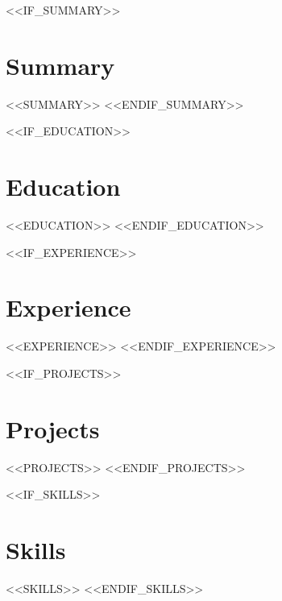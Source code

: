 \documentclass{article}
\begin{document}
\begin{center}
{\sffamily\LARGE\bfseries {}} \par\bigskip
\sffamily\footnotesize {} \par\bigskip
\end{center}

<<IF_SUMMARY>>
\section{Summary}
<<SUMMARY>>
<<ENDIF_SUMMARY>>

<<IF_EDUCATION>>
\section{Education}
<<EDUCATION>>
<<ENDIF_EDUCATION>>

<<IF_EXPERIENCE>>
\section{Experience}
<<EXPERIENCE>>
<<ENDIF_EXPERIENCE>>

<<IF_PROJECTS>>
\section{Projects}
<<PROJECTS>>
<<ENDIF_PROJECTS>>

<<IF_SKILLS>>
\section{Skills}
<<SKILLS>>
<<ENDIF_SKILLS>>
\end{document}
